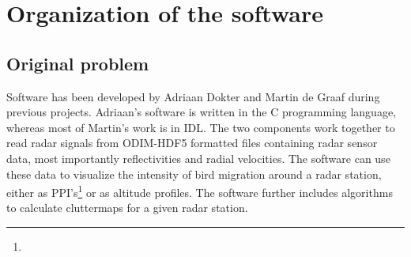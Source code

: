 \chapter{Organization of the software}
\label{ch:design-philosophy}


\section{Original problem}

Software has been developed by Adriaan Dokter and Martin de Graaf during previous projects. Adriaan's software is written in the C programming language, whereas most of Martin's work is in IDL. The two components work together to read radar signals from ODIM-HDF5 formatted files containing radar sensor data, most importantly reflectivities and radial velocities. The software can use these data to visualize the intensity of bird migration around a radar station, either as PPI's\footnote{} or as altitude profiles. The software further includes algorithms to calculate cluttermaps for a given radar station.

